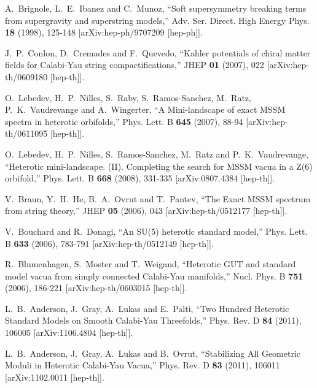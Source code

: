 \documentclass[12pt]{article}
\numberwithin{equation}{section}
\begin{document}
\begin{thebibliography}{999}
A.~Brignole, L.~E.~Ibanez and C.~Munoz,
``Soft supersymmetry breaking terms from supergravity and superstring models,''
Adv. Ser. Direct. High Energy Phys. \textbf{18} (1998), 125-148
[arXiv:hep-ph/9707209 [hep-ph]].

J.~P.~Conlon, D.~Cremades and F.~Quevedo,
``Kahler potentials of chiral matter fields for Calabi-Yau string compactifications,''
JHEP \textbf{01} (2007), 022
[arXiv:hep-th/0609180 [hep-th]].

O.~Lebedev, H.~P.~Nilles, S.~Raby, S.~Ramos-Sanchez, M.~Ratz, P.~K.~Vaudrevange and A.~Wingerter,
``A Mini-landscape of exact MSSM spectra in heterotic orbifolds,''
Phys. Lett. B \textbf{645} (2007), 88-94
[arXiv:hep-th/0611095 [hep-th]].

O.~Lebedev, H.~P.~Nilles, S.~Ramos-Sanchez, M.~Ratz and P.~K.~Vaudrevange,
``Heterotic mini-landscape. (II). Completing the search for MSSM vacua in a Z(6) orbifold,''
Phys. Lett. B \textbf{668} (2008), 331-335
[arXiv:0807.4384 [hep-th]].

V.~Braun, Y.~H.~He, B.~A.~Ovrut and T.~Pantev,
``The Exact MSSM spectrum from string theory,''
JHEP \textbf{05} (2006), 043
[arXiv:hep-th/0512177 [hep-th]].

V.~Bouchard and R.~Donagi,
``An SU(5) heterotic standard model,''
Phys. Lett. B \textbf{633} (2006), 783-791
[arXiv:hep-th/0512149 [hep-th]].

R.~Blumenhagen, S.~Moster and T.~Weigand,
``Heterotic GUT and standard model vacua from simply connected Calabi-Yau manifolds,''
Nucl. Phys. B \textbf{751} (2006), 186-221
[arXiv:hep-th/0603015 [hep-th]].

L.~B.~Anderson, J.~Gray, A.~Lukas and E.~Palti,
``Two Hundred Heterotic Standard Models on Smooth Calabi-Yau Threefolds,''
Phys. Rev. D \textbf{84} (2011), 106005
[arXiv:1106.4804 [hep-th]].

L.~B.~Anderson, J.~Gray, A.~Lukas and B.~Ovrut,
``Stabilizing All Geometric Moduli in Heterotic Calabi-Yau Vacua,''
Phys. Rev. D \textbf{83} (2011), 106011
[arXiv:1102.0011 [hep-th]].


\end{thebibliography}
\end{document}
